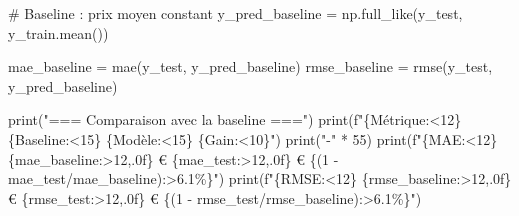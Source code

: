 \documentclass[
  french,
  11pt,
  a4paper,
]{scrbook}
\newenvironment{Shaded}{}{}
\newcommand{\BuiltInTok}[1]{\textcolor[rgb]{0.84,0.23,0.29}{#1}}
\newcommand{\CommentTok}[1]{\textcolor[rgb]{0.42,0.45,0.49}{#1}}
\newcommand{\DecValTok}[1]{\textcolor[rgb]{0.00,0.36,0.77}{#1}}
\newcommand{\NormalTok}[1]{\textcolor[rgb]{0.14,0.16,0.18}{#1}}
\newcommand{\OperatorTok}[1]{\textcolor[rgb]{0.14,0.16,0.18}{#1}}
\newcommand{\SpecialCharTok}[1]{\textcolor[rgb]{0.00,0.36,0.77}{#1}}
\newcommand{\SpecialStringTok}[1]{\textcolor[rgb]{0.01,0.18,0.38}{#1}}
\newcommand{\StringTok}[1]{\textcolor[rgb]{0.01,0.18,0.38}{#1}}
\begin{document}
\begin{tcolorbox}[enhanced jigsaw, arc=.35mm, bottomrule=.15mm, bottomtitle=1mm, breakable, colback=white, colbacktitle=quarto-callout-tip-color!10!white, colframe=quarto-callout-tip-color-frame, coltitle=black, left=2mm, leftrule=.75mm, opacityback=0, opacitybacktitle=0.6, rightrule=.15mm, title=\textcolor{quarto-callout-tip-color}{\faLightbulb}\hspace{0.5em}{✅ Corrigé Étape 5.3}, titlerule=0mm, toprule=.15mm, toptitle=1mm]

\begin{Shaded}
\begin{Highlighting}[]
\CommentTok{\# Baseline : prix moyen constant}
\NormalTok{y\_pred\_baseline }\OperatorTok{=}\NormalTok{ np.full\_like(y\_test, y\_train.mean())}

\NormalTok{mae\_baseline }\OperatorTok{=}\NormalTok{ mae(y\_test, y\_pred\_baseline)}
\NormalTok{rmse\_baseline }\OperatorTok{=}\NormalTok{ rmse(y\_test, y\_pred\_baseline)}

\BuiltInTok{print}\NormalTok{(}\StringTok{"=== Comparaison avec la baseline ==="}\NormalTok{)}
\BuiltInTok{print}\NormalTok{(}\SpecialStringTok{f"}\SpecialCharTok{\{}\StringTok{\textquotesingle{}Métrique\textquotesingle{}}\SpecialCharTok{:\textless{}12\}}\SpecialStringTok{ }\SpecialCharTok{\{}\StringTok{\textquotesingle{}Baseline\textquotesingle{}}\SpecialCharTok{:\textless{}15\}}\SpecialStringTok{ }\SpecialCharTok{\{}\StringTok{\textquotesingle{}Modèle\textquotesingle{}}\SpecialCharTok{:\textless{}15\}}\SpecialStringTok{ }\SpecialCharTok{\{}\StringTok{\textquotesingle{}Gain\textquotesingle{}}\SpecialCharTok{:\textless{}10\}}\SpecialStringTok{"}\NormalTok{)}
\BuiltInTok{print}\NormalTok{(}\StringTok{"{-}"} \OperatorTok{*} \DecValTok{55}\NormalTok{)}
\BuiltInTok{print}\NormalTok{(}\SpecialStringTok{f"}\SpecialCharTok{\{}\StringTok{\textquotesingle{}MAE\textquotesingle{}}\SpecialCharTok{:\textless{}12\}}\SpecialStringTok{ }\SpecialCharTok{\{}\NormalTok{mae\_baseline}\SpecialCharTok{:\textgreater{}12,.0f\}}\SpecialStringTok{ € }\SpecialCharTok{\{}\NormalTok{mae\_test}\SpecialCharTok{:\textgreater{}12,.0f\}}\SpecialStringTok{ € }\SpecialCharTok{\{}\NormalTok{(}\DecValTok{1} \OperatorTok{{-}}\NormalTok{ mae\_test}\OperatorTok{/}\NormalTok{mae\_baseline)}\SpecialCharTok{:\textgreater{}6.1\%\}}\SpecialStringTok{"}\NormalTok{)}
\BuiltInTok{print}\NormalTok{(}\SpecialStringTok{f"}\SpecialCharTok{\{}\StringTok{\textquotesingle{}RMSE\textquotesingle{}}\SpecialCharTok{:\textless{}12\}}\SpecialStringTok{ }\SpecialCharTok{\{}\NormalTok{rmse\_baseline}\SpecialCharTok{:\textgreater{}12,.0f\}}\SpecialStringTok{ € }\SpecialCharTok{\{}\NormalTok{rmse\_test}\SpecialCharTok{:\textgreater{}12,.0f\}}\SpecialStringTok{ € }\SpecialCharTok{\{}\NormalTok{(}\DecValTok{1} \OperatorTok{{-}}\NormalTok{ rmse\_test}\OperatorTok{/}\NormalTok{rmse\_baseline)}\SpecialCharTok{:\textgreater{}6.1\%\}}\SpecialStringTok{"}\NormalTok{)}
\end{Highlighting}
\end{Shaded}


\end{tcolorbox}
\end{document}
